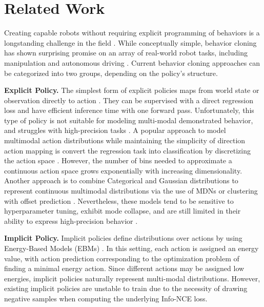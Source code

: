 \documentclass[Afour,sageh,times]{sagej}
\begin{document}
\section{Related Work}
Creating capable robots without requiring explicit programming of behaviors is a longstanding challenge in the field \cite{atkeson1997robot, argall2009survey, ravichandar2020recent}.
While conceptually simple, behavior cloning has shown surprising promise on an array of real-world robot tasks, including manipulation \cite{zhang2018deep, florence2019self, mandlekar2020learning, mandlekar2020iris, zeng2021transporter, rahmatizadeh2018vision, avigal2022speedfolding} and autonomous driving \cite{pomerleau1988alvinn, bojarski2016end}. Current behavior cloning approaches can be categorized into two groups, depending on the policy's structure.


\textbf{Explicit Policy.}
The simplest form of explicit policies maps from world state or observation directly to action \cite{pomerleau1988alvinn, zhang2018deep, florence2019self, ross2011reduction, toyer2020magical, rahmatizadeh2018vision, bojarski2016end}. They can be supervised with a direct regression loss and have efficient inference time with one forward pass. Unfortunately, this type of policy is not suitable for modeling multi-modal demonstrated behavior,
and struggles with high-precision tasks \cite{ibc}.
A popular approach to model multimodal action distributions while maintaining the simplicity of direction action mapping is convert the regression task into classification by discretizing the action space \cite{zeng2021transporter, wu2020spatial, avigal2022speedfolding}.
However, the number of bins needed to approximate a continuous action space grows exponentially with increasing dimensionality.
Another approach is to combine Categorical and Gaussian distributions to represent continuous multimodal distributions via the use of MDNs \cite{bishop1994mixture, robomimic} or clustering with offset prediction \cite{bet, sharma2018multiple}. Nevertheless, these models tend to be sensitive to hyperparameter tuning, exhibit mode collapse, and are still limited in their ability to express high-precision behavior \cite{ibc}.



\textbf{Implicit Policy.}
Implicit policies \citep{ibc, jarrett2020strictly} define distributions over actions by using Energy-Based Models (EBMs) \citep{lecun06atutorial, du2019implicit, dai2019exponential, grathwohl2020stein, du2020improved}.
In this setting, each action is assigned an energy value, with action prediction corresponding to the optimization problem of finding a minimal energy action. Since different actions may be assigned low energies, implicit policies naturally represent multi-modal distributions. However, existing implicit policies \citep{ibc} are unstable to train due to the necessity of drawing negative samples when computing the underlying Info-NCE loss. %
\end{document}
